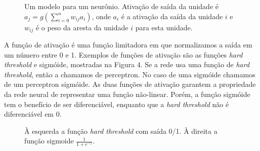 \documentclass[a4paper,10pt]{article}
\theoremstyle{plain}
\begin{document}
\begin{figure}[h]
  \caption{Um modelo para um neurônio. Ativação de saída da unidade é $a_j = g(\sum_{i=0}^n w_{ij}
    a_i)$, onde $a_i$ é a ativação da saída da unidade $i$ e $w_{ij}$ é o peso da aresta da unidade
    $i$ para esta unidade.}
\end{figure}

A função de ativação é uma função limitadora em que normalizamos a saída em um número entre 0 e 1.
Exemplos de funções de ativação são as funções \textit{hard threshold} e sigmóide, mostradas na
Figura 4. Se a rede usa uma função de \textit{hard threshold}, então a chamamos de perceptron. No
caso de uma sigmóide chamamos de um perceptron sigmóide. As duas funções de ativação garantem a
propriedade da rede neural de representar uma função não-linear. Porém, a função sigmóide tem o
benefício de ser diferenciável, enquanto que a \textit{hard threshold} não é diferenciável em 0.

\begin{figure}[h]
  \caption{À esquerda a função \textit{hard threshold} com saída 0/1. À direita a função sigmoide
    $\frac{1}{1+e^{-z}}$.}
\end{figure}
\end{document}
